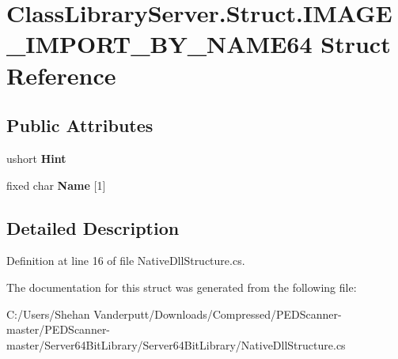\hypertarget{struct_class_library_server_1_1_struct_1_1_i_m_a_g_e___i_m_p_o_r_t___b_y___n_a_m_e64}{}\section{Class\+Library\+Server.\+Struct.\+I\+M\+A\+G\+E\+\_\+\+I\+M\+P\+O\+R\+T\+\_\+\+B\+Y\+\_\+\+N\+A\+M\+E64 Struct Reference}
\label{struct_class_library_server_1_1_struct_1_1_i_m_a_g_e___i_m_p_o_r_t___b_y___n_a_m_e64}
\subsection*{Public Attributes}
\begin{DoxyCompactItemize}
\item 
\mbox{\label{struct_class_library_server_1_1_struct_1_1_i_m_a_g_e___i_m_p_o_r_t___b_y___n_a_m_e64_a4ac2222260732dff200fa956be2c7186}} 
ushort {\bfseries Hint}
\item 
\mbox{\label{struct_class_library_server_1_1_struct_1_1_i_m_a_g_e___i_m_p_o_r_t___b_y___n_a_m_e64_adee25ffb38d0e03150db67c42e492331}} 
fixed char {\bfseries Name} \mbox{[}1\mbox{]}
\end{DoxyCompactItemize}


\subsection{Detailed Description}


Definition at line 16 of file Native\+Dll\+Structure.\+cs.



The documentation for this struct was generated from the following file\+:\begin{DoxyCompactItemize}
\item 
C\+:/\+Users/\+Shehan Vanderputt/\+Downloads/\+Compressed/\+P\+E\+D\+Scanner-\/master/\+P\+E\+D\+Scanner-\/master/\+Server64\+Bit\+Library/\+Server64\+Bit\+Library/Native\+Dll\+Structure.\+cs\end{DoxyCompactItemize}
